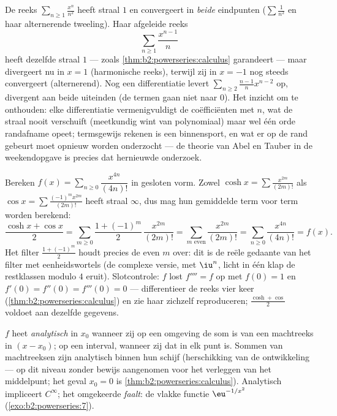 \begin{example}\label{ex:b2:powerseries:boundaryloss}
De reeks $\sum_{n\geq1}\frac{x^n}{n^2}$ heeft straal $1$ en
convergeert in \emph{beide} eindpunten ($\sum\frac1{n^2}$ en haar
alternerende tweeling). Haar afgeleide reeks
\[
\sum_{n\geq1}\frac{x^{n-1}}{n}
\]
heeft dezelfde straal $1$ --- zoals
\cref{thm:b2:powerseries:calculus} garandeert --- maar divergeert
nu in $x = 1$ (harmonische reeks), terwijl zij in $x = -1$ nog
steeds convergeert (alternerend). Nog een differentiatie levert
$\sum_{n\geq2}\frac{n-1}{n}x^{n-2}$ op, divergent aan beide
uiteinden (de termen gaan niet naar $0$). Het inzicht om te
onthouden: elke differentiatie vermenigvuldigt de coëfficiënten met
$n$, wat de straal nooit verschuift (meetkundig wint van
polynomiaal) maar wel één orde randafname opeet; termsgewijs
rekenen is een binnensport, en wat er op de rand gebeurt moet
opnieuw worden onderzocht --- de theorie van Abel en Tauber in de
weekendopgave is precies dat hernieuwde onderzoek.
\end{example}

\begin{example}\label{ex:b2:powerseries:quarter}
Bereken $f(x) = \sum_{n\geq0} \dfrac{x^{4n}}{(4n)!}$ in gesloten
vorm. Zowel $\cosh x = \sum \frac{x^{2m}}{(2m)!}$ als $\cos x =
\sum \frac{(-1)^m x^{2m}}{(2m)!}$ heeft straal $\infty$, dus mag
hun gemiddelde term voor term worden berekend:
\[
\frac{\cosh x + \cos x}{2}
= \sum_{m\geq0}\frac{1 + (-1)^m}{2}\,\frac{x^{2m}}{(2m)!}
= \sum_{m \text{ even}}\frac{x^{2m}}{(2m)!}
= \sum_{n\geq0}\frac{x^{4n}}{(4n)!} = f(x) .
\]
Het filter $\frac{1+(-1)^m}{2}$ houdt precies de even $m$ over: dit
is de reële gedaante van het filter met eenheidswortels (de
complexe versie, met $\iu^n$, licht in één klap de restklassen
modulo $4$ eruit). Slotcontrole: $f$ lost $f'''' = f$ op met $f(0)
= 1$ en $f'(0) = f''(0) = f'''(0) = 0$ --- differentieer de reeks
vier keer (\cref{thm:b2:powerseries:calculus}) en zie haar
zichzelf reproduceren; $\frac{\cosh + \cos}{2}$ voldoet aan
dezelfde gegevens.
\end{example}

\begin{definition}\label{def:b2:powerseries:analytic}
$f$ heet \emph{analytisch} in $x_0$
wanneer zij op een omgeving de som is van een machtreeks in $(x -
x_0)$; op een interval, wanneer zij dat in elk punt is. Sommen van
machtreeksen zijn analytisch binnen hun schijf (herschikking van de
ontwikkeling --- op dit niveau zonder bewijs aangenomen voor het
verleggen van het middelpunt; het geval $x_0 = 0$ is
\cref{thm:b2:powerseries:calculus}). Analytisch impliceert
$C^\infty$; het omgekeerde \emph{faalt}: de vlakke functie
$\eu^{-1/x^2}$ (\cref{exo:b2:powerseries:7}).
\end{definition}

